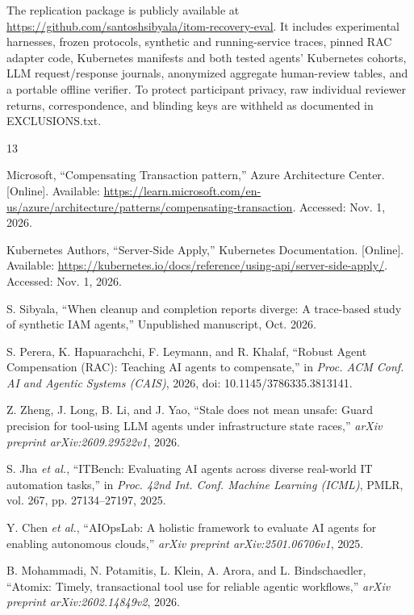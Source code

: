 \documentclass[conference,10pt]{IEEEtran}
\begin{document}
The replication package is publicly available at \url{https://github.com/santoshsibyala/itom-recovery-eval}. It includes experimental harnesses, frozen protocols, synthetic and running\hyp{}service traces, pinned RAC adapter code, Kubernetes manifests and both tested agents' Kubernetes cohorts, LLM request/response journals, anonymized aggregate human\hyp{}review tables, and a portable offline verifier. To protect participant privacy, raw individual reviewer returns, correspondence, and blinding keys are withheld as documented in EXCLUSIONS.txt.

\begin{thebibliography}{13}

Microsoft, ``Compensating Transaction pattern,'' Azure Architecture Center. [Online]. Available: \url{https://learn.microsoft.com/en-us/azure/architecture/patterns/compensating-transaction}. Accessed: Nov. 1, 2026.

Kubernetes Authors, ``Server\hyp{}Side Apply,'' Kubernetes Documentation. [Online]. Available: \url{https://kubernetes.io/docs/reference/using-api/server-side-apply/}. Accessed: Nov. 1, 2026.

S. Sibyala, ``When cleanup and completion reports diverge: A trace\hyp{}based study of synthetic IAM agents,'' Unpublished manuscript, Oct. 2026.

S. Perera, K. Hapuarachchi, F. Leymann, and R. Khalaf, ``Robust Agent Compensation (RAC): Teaching AI agents to compensate,'' in \emph{Proc. ACM Conf. AI and Agentic Systems (CAIS)}, 2026, doi: 10.1145/3786335.3813141.

Z. Zheng, J. Long, B. Li, and J. Yao, ``Stale does not mean unsafe: Guard precision for tool\hyp{}using LLM agents under infrastructure state races,'' \emph{arXiv preprint arXiv:2609.29522v1}, 2026.

S. Jha \emph{et al.}, ``ITBench: Evaluating AI agents across diverse real\hyp{}world IT automation tasks,'' in \emph{Proc. 42nd Int. Conf. Machine Learning (ICML)}, PMLR, vol. 267, pp. 27134--27197, 2025.

Y. Chen \emph{et al.}, ``AIOpsLab: A holistic framework to evaluate AI agents for enabling autonomous clouds,'' \emph{arXiv preprint arXiv:2501.06706v1}, 2025.

B. Mohammadi, N. Potamitis, L. Klein, A. Arora, and L. Bindschaedler, ``Atomix: Timely, transactional tool use for reliable agentic workflows,'' \emph{arXiv preprint arXiv:2602.14849v2}, 2026.


\end{thebibliography}
\end{document}
